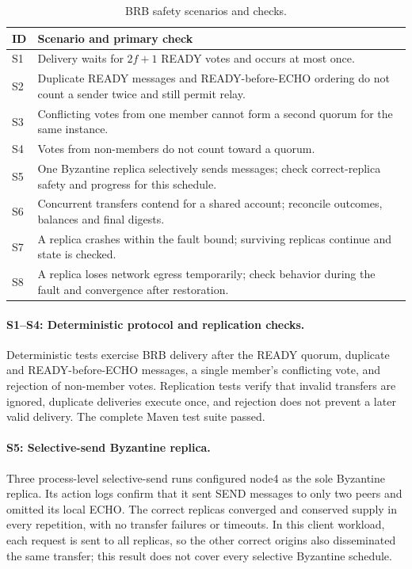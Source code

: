 \documentclass[sigconf,a4paper]{acmart}
\begin{document}
    \begin{table}[t]
        \centering
        \scriptsize
        \setlength{\tabcolsep}{3pt}
        \caption{BRB safety scenarios and checks.}
        \label{tab:brb-scenarios}
        \begin{tabular}{p{0.55cm}>{\raggedright\arraybackslash}p{6.65cm}}
            \toprule
            \textbf{ID} & \textbf{Scenario and primary check} \\
            \midrule
            S1 & Delivery waits for $2f+1$ READY votes and occurs at most once. \\
            S2 & Duplicate READY messages and READY-before-ECHO ordering do not count a sender twice and still permit relay. \\
            S3 & Conflicting votes from one member cannot form a second quorum for the same instance. \\
            S4 & Votes from non-members do not count toward a quorum. \\
            S5 & One Byzantine replica selectively sends messages; check correct-replica safety and progress for this schedule. \\
            S6 & Concurrent transfers contend for a shared account; reconcile outcomes, balances and final digests. \\
            S7 & A replica crashes within the fault bound; surviving replicas continue and state is checked. \\
            S8 & A replica loses network egress temporarily; check behavior during the fault and convergence after restoration. \\
            \bottomrule
        \end{tabular}
    \end{table}

    \paragraph{S1--S4: Deterministic protocol and replication checks.}

    Deterministic tests exercise BRB delivery after the READY quorum, duplicate
    and READY-before-ECHO messages, a single member's conflicting vote, and
    rejection of non-member votes. Replication tests verify that invalid
    transfers are ignored, duplicate deliveries execute once, and rejection
    does not prevent a later valid delivery. The complete Maven test suite
    passed.

    \paragraph{S5: Selective-send Byzantine replica.}
    Three process-level selective-send runs configured node4 as the sole
    Byzantine replica. Its action logs confirm that it sent SEND messages to
    only two peers and omitted its local ECHO. The correct replicas converged
    and conserved supply in every repetition, with no transfer failures or
    timeouts. In this client workload, each request is sent to all replicas, so
    the other correct origins also disseminated the same transfer; this result
    does not cover every selective Byzantine schedule.
\end{document}
